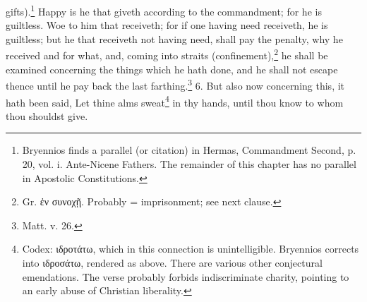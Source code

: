 gifts).\footnote{\par  Bryennios finds a parallel (or citation) in Hermas, Commandment Second, p. 20, vol. i. Ante-Nicene Fathers. The remainder of this chapter has no parallel in Apostolic Constitutions.} Happy is he that giveth according to the commandment; for he is guiltless. Woe to him that receiveth; for if one having need receiveth, he is guiltless; but he that receiveth not having need, shall pay the penalty, why he received and for what, and, coming into straits (confinement),\footnote{\par  Gr. \textgreek{ἐν συνοχῇ}. Probably = imprisonment; see next clause.} he shall be examined concerning the things which he hath done, and he shall not escape thence until he pay back the last farthing.\footnote{\par  Matt. v. 26.} 6. But also now concerning this, it hath been said, Let thine alms sweat\footnote{\par  Codex: \textgreek{ιδροτάτω}, which in this connection is unintelligible. Bryennios corrects into \textgreek{ιδροσάτω}, rendered as above. There are various other conjectural emendations. The verse probably forbids indiscriminate charity, pointing to an early abuse of Christian liberality.} in thy hands, until thou know to whom thou shouldst give.


